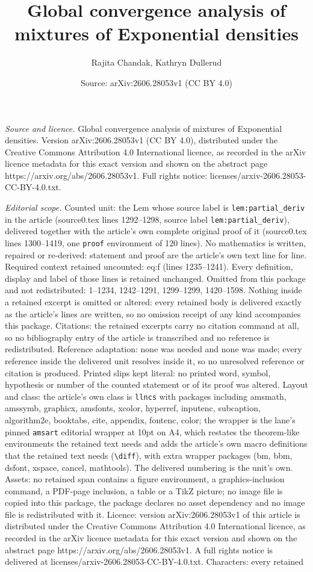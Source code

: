\documentclass[10pt,a4paper]{amsart}
\title[Global convergence analysis of mixtures of Exponential densi]{Global convergence analysis of mixtures of Exponential densities}
\author{Rajita Chandak, Kathryn Dullerud}
\date{Source: arXiv:2606.28053v1 (CC BY 4.0)}
\begin{document}
\maketitle

\noindent\emph{Source and licence.} Global convergence analysis of mixtures of Exponential densities. Version arXiv:2606.28053v1 (CC BY 4.0), distributed under the Creative Commons Attribution 4.0 International licence, as recorded in the arXiv licence metadata for this exact version and shown on the abstract page https://arxiv.org/abs/2606.28053v1. Full rights notice: licenses/arxiv-2606.28053-CC-BY-4.0.txt.\par\smallskip

\noindent\textit{Editorial scope.} Counted unit: the Lem whose source label is \texttt{lem:partial\_deriv} in the article (source0.tex lines 1292--1298, source label \texttt{lem:partial\_deriv}), delivered together with the article's own complete original proof of it (source0.tex lines 1300--1419, one \texttt{proof} environment of 120 lines). No mathematics is written, repaired or re-derived: statement and proof are the article's own text line for line. Required context retained uncounted: eq:f (lines 1235--1241). Every definition, display and label of those lines is retained unchanged. Omitted from this package and not redistributed: 1--1234, 1242--1291, 1299--1299, 1420--1598. Nothing inside a retained excerpt is omitted or altered: every retained body is delivered exactly as the article's lines are written, so no omission receipt of any kind accompanies this package. Citations: the retained excerpts carry no citation command at all, so no bibliography entry of the article is transcribed and no reference is redistributed. Reference adaptation: none was needed and none was made; every reference inside the delivered unit resolves inside it, so no unresolved reference or citation is produced. Printed slips kept literal: no printed word, symbol, hypothesis or number of the counted statement or of its proof was altered. Layout and class: the article's own class is \texttt{llncs} with packages including amsmath, amssymb, graphicx, amsfonts, xcolor, hyperref, inputenc, subcaption, algorithm2e, booktabs, cite, appendix, fontenc, color; the wrapper is the lane's pinned \texttt{amsart} editorial wrapper at 10pt on A4, which restates the theorem-like environments the retained text needs and adds the article's own macro definitions that the retained text needs (\texttt{\textbackslash diff}), with extra wrapper packages (bm, bbm, dsfont, xspace, cancel, mathtools). The delivered numbering is the unit's own. Assets: no retained span contains a figure environment, a graphics-inclusion command, a PDF-page inclusion, a table or a TikZ picture; no image file is copied into this package, the package declares no asset dependency and no image file is redistributed with it. Licence: version arXiv:2606.28053v1 of this article is distributed under the Creative Commons Attribution 4.0 International licence, as recorded in the arXiv licence metadata for this exact version and shown on the abstract page https://arxiv.org/abs/2606.28053v1. A full rights notice is delivered at licenses/arxiv-2606.28053-CC-BY-4.0.txt. Characters: every retained 
\end{document}
